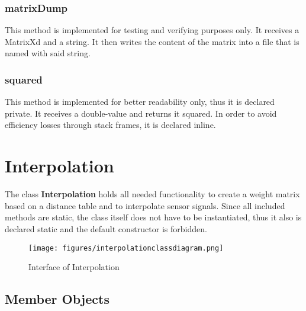 \subsubsection{matrixDump}
This method is implemented for testing and verifying purposes only. It receives a MatrixXd and a string. It then writes the content of the matrix into a file that is named with said string.

\subsubsection{squared}
This method is implemented for better readability only, thus it is declared private. It receives a double-value and returns it squared. In order to avoid efficiency losses through stack frames, it is declared inline.

\clearpage


\section{Interpolation}
The class \textbf{Interpolation} holds all needed functionality to create a weight matrix based on a distance table and to interpolate sensor signals. Since all included methods are static, the class itself does not have to be instantiated, thus it also is declared static and the default constructor is forbidden.

\begin{figure}[h]
	\begin{center}
		\texttt{[image: figures/interpolationclassdiagram.png]}
		\caption{Interface of Interpolation}
	\end{center}
\end{figure}

\subsection{Member Objects}

